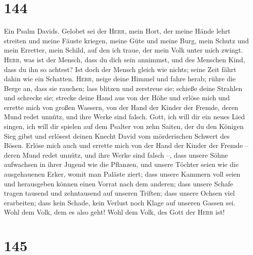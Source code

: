 \hypertarget{section-143}{%
\section{144}\label{section-143}}

 Ein Psalm Davids. Gelobet sei der \textsc{Herr}, mein
Hort, der meine Hände lehrt streiten und meine Fäuste kriegen,
 meine Güte und meine Burg, mein Schutz und mein Erretter,
mein Schild, auf den ich traue, der mein Volk unter mich zwingt.
 \textsc{Herr}, was ist der Mensch, dass du dich sein
annimmst, und des Menschen Kind, dass du ihn so achtest? 
Ist doch der Mensch gleich wie nichts; seine Zeit fährt dahin wie ein
Schatten.  \textsc{Herr}, neige deine Himmel und fahre
herab; rühre die Berge an, dass sie rauchen;  lass blitzen
und zerstreue sie; schieße deine Strahlen und schrecke sie;
 strecke deine Hand aus von der Höhe und erlöse mich und
errette mich von großen Wassern, von der Hand der Kinder der Fremde,
 deren Mund redet unnütz, und ihre Werke sind falsch.
 Gott, ich will dir ein neues Lied singen, ich will dir
spielen auf dem Psalter von zehn Saiten,  der du den
Königen Sieg gibst und erlösest deinen Knecht David vom mörderischen
Schwert des Bösen.  Erlöse mich auch und errette mich von
der Hand der Kinder der Fremde -- deren Mund redet unnütz, und ihre
Werke sind falsch --,  dass unsere Söhne aufwachsen in
ihrer Jugend wie die Pflanzen, und unsere Töchter seien wie die
ausgehauenen Erker, womit man Paläste ziert;  dass unsere
Kammern voll seien und herausgeben können einen Vorrat nach dem anderen;
dass unsere Schafe tragen tausend und zehntausend auf unseren Triften;
 dass unsere Ochsen viel erarbeiten; dass kein Schade,
kein Verlust noch Klage auf unseren Gassen sei.  Wohl dem
Volk, dem es also geht! Wohl dem Volk, des Gott der \textsc{Herr} ist!

\hypertarget{section-144}{%
\section{145}\label{section-144}}

